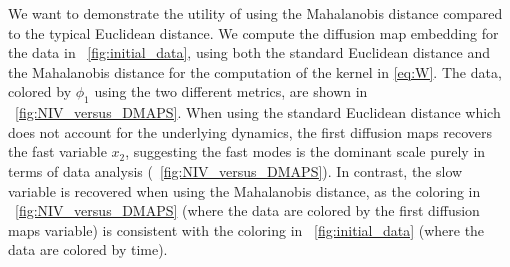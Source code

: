 We want to demonstrate the utility of using the Mahalanobis distance compared to the typical Euclidean distance.
%
We compute the diffusion map embedding for the data in \fig~\ref{fig:initial_data},
using both the standard Euclidean distance and the Mahalanobis distance for the computation of the kernel in \eqref{eq:W}.
%
The data, colored by $\phi_1$ using the two different metrics, are shown in \fig~\ref{fig:NIV_versus_DMAPS}.
%
When using the standard Euclidean distance which does not account for the underlying dynamics, the first diffusion maps recovers the fast variable $x_2$, suggesting the fast modes is the dominant scale purely in terms of data analysis (\fig~\ref{fig:NIV_versus_DMAPS}).
%
In contrast, the slow variable is recovered when using the Mahalanobis distance, as the coloring in \fig~\ref{fig:NIV_versus_DMAPS} (where the data are colored by the first diffusion maps variable) is consistent with the coloring in \fig~\ref{fig:initial_data} (where the data are colored by time).

